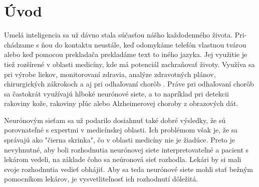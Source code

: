 \chapter{Úvod}


Umelá inteligencia sa už dávno stala súčasťou nášho každodenného života. Pri-chádzame s ňou do kontaktu neustále, keď odomykáme telefón vlastnou tvárou alebo keď pomocou prekladača prekladáme text to iného jazyka. 
Jej využitie je tiež rozšírené v oblasti medicíny, kde má potenciál zachraňovať životy. Využíva sa pri výrobe liekov, monitorovaní zdravia, analýze zdravotných plánov, chirurgických zákrokoch a aj pri odhaľovaní chorôb \cite{amisha2019overview}.
Práve pri odhaľovaní chorôb sa častokrát využívajú hlboké neurónové siete, a to napríklad pri detekcii rakoviny kože, rakoviny pľúc alebo Alzheimerovej choroby z obrazových dát.

Neurónovým sieťam sa už podarilo dosiahnuť také dobré výsledky, že sú porovnateľné s expertmi v medicínskej oblasti.
Ich problémom však je, že sa správajú ako "čierna skrinka", čo v oblasti medicíny nie je žiadúce. Preto je nevyhnutné, aby boli rozhodnutia neurónovej siete interpretovateľné a pacient s lekárom vedeli, na základe čoho sa neúronová sieť rozhodla. Lekári by si mali svoje rozhodnutia vedieť obhájiť. Aby sa teda neurónové siete mohli stať bežným pomocníkom lekárov, je vysvetliteľnosť ich rozhodnutí dôležitá.